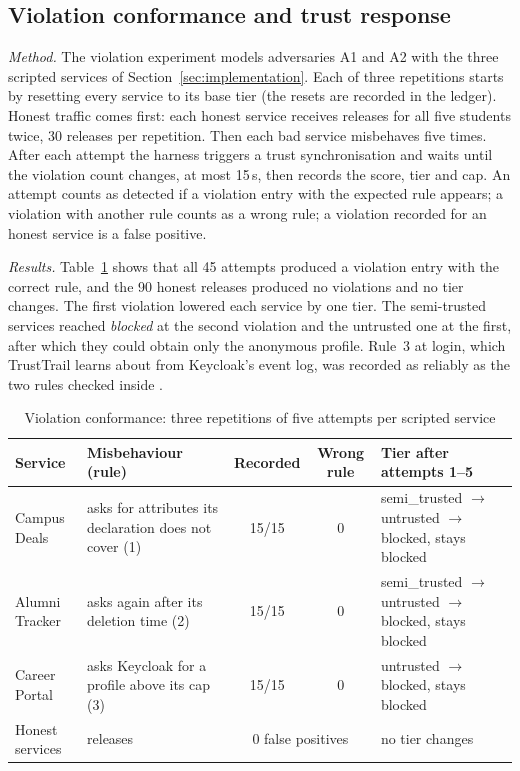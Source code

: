 \subsection{Violation conformance and trust response}
\label{sec:eval-violation}
\emph{Method.} The violation experiment models adversaries A1 and A2 with the three scripted services of Section~\ref{sec:implementation}. Each of three repetitions starts by resetting every service to its base tier (the resets are recorded in the ledger). Honest traffic comes first: each honest service receives releases for all five students twice, 30 releases per repetition. Then each bad service misbehaves five times. After each attempt the harness triggers a trust synchronisation and waits until the violation count changes, at most 15\,s, then records the score, tier and cap. An attempt counts as detected if a violation entry with the expected rule appears; a violation with another rule counts as a wrong rule; a violation recorded for an honest service is a false positive.

\emph{Results.} Table~\ref{tab:violations} shows that all 45 attempts produced a violation entry with the correct rule, and the 90 honest releases produced no violations and no tier changes. The first violation lowered each service by one tier. The semi-trusted services reached \emph{blocked} at the second violation and the untrusted one at the first, after which they could obtain only the anonymous profile. Rule~3 at login, which TrustTrail learns about from Keycloak's event log, was recorded as reliably as the two rules checked inside .

\begin{table}[t]
\centering
\caption{Violation conformance: three repetitions of five attempts per scripted service}
\label{tab:violations}
\small
\begin{tabularx}{\linewidth}{@{}l >{\raggedright\arraybackslash}X c c >{\raggedright\arraybackslash}p{4.6cm}@{}}
\toprule
Service & Misbehaviour (rule) & Recorded & Wrong rule & Tier after attempts 1--5 \\
\midrule
Campus Deals & asks for attributes its declaration does not cover (1) & 15/15 & 0 & semi\_trusted $\rightarrow$ untrusted $\rightarrow$ blocked, stays blocked \\
Alumni Tracker & asks again after its deletion time (2) & 15/15 & 0 & semi\_trusted $\rightarrow$ untrusted $\rightarrow$ blocked, stays blocked \\
Career Portal & asks Keycloak for a profile above its cap (3) & 15/15 & 0 & untrusted $\rightarrow$ blocked, stays blocked \\
\midrule
Honest services & 90 releases & \multicolumn{2}{c}{0 false positives} & no tier changes \\
\bottomrule
\end{tabularx}
\end{table}


